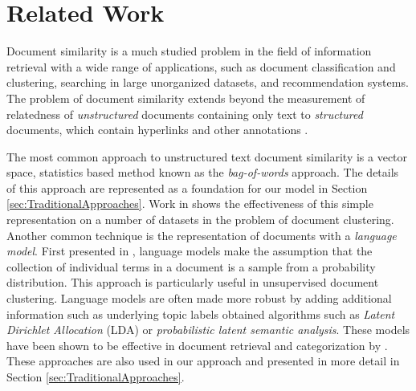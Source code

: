 \documentclass[11pt]{article}
\begin{document}
\section{Related Work} \label{sec:RelatedWork}

Document similarity is a much studied problem in the field of information retrieval with a wide range of applications, such as document classification and clustering, searching in large unorganized datasets, and recommendation systems. The problem of document similarity extends beyond the measurement of relatedness of \emph{unstructured} documents containing only text to \emph{structured} documents, which contain hyperlinks and other annotations \cite{Manning2008}. 

The most common approach to unstructured text document similarity is a vector space, statistics based method known as the  \emph{bag-of-words} approach. The details of this approach are represented as a foundation for our model in Section \ref{sec:TraditionalApproaches}. Work in \cite{Huang2008} shows the effectiveness of this simple representation on a number of datasets in the problem of document clustering. Another common technique is the representation of documents with a \emph{language model}. First presented in \cite{Ponte1998}, language models make the assumption that the collection of individual terms in a document is a sample from a probability distribution. This approach is particularly useful in unsupervised document clustering.  Language models are often made more robust by adding additional information such as underlying topic labels obtained algorithms such as \emph{Latent Dirichlet Allocation} (LDA) or \emph{probabilistic latent semantic analysis}.  These models have been shown to be effective in document retrieval and categorization by \cite{Hofmann2000}. These approaches are also used in our approach and presented in more detail in Section \ref{sec:TraditionalApproaches}. 
\end{document}
